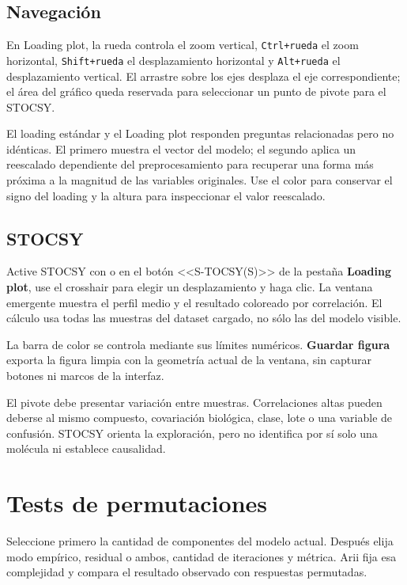 \documentclass[11pt,a4paper,openany]{report}
\newcommand{\menu}[1]{\textbf{#1}}
\newcommand{\code}[1]{\texttt{#1}}
\newcommand{\tecla}[1]{\fbox{\strut\textsf{#1}}}
\begin{document}
\section{Navegación}

En Loading plot, la rueda controla el zoom vertical, \code{Ctrl+rueda} el zoom
horizontal, \code{Shift+rueda} el desplazamiento horizontal y
\code{Alt+rueda} el desplazamiento vertical. El arrastre sobre los ejes desplaza
el eje correspondiente; el área del gráfico queda reservada para seleccionar un
punto de pivote para el STOCSY.

El loading estándar y el Loading plot responden preguntas relacionadas pero no
idénticas. El primero muestra el vector del modelo; el segundo aplica un
reescalado dependiente del preprocesamiento para recuperar una forma más próxima
a la magnitud de las variables originales. Use el color para conservar el signo
del loading y la altura para inspeccionar el valor reescalado.

\section{STOCSY}

Active STOCSY con \tecla{S} o en el botón <<S-TOCSY(S)>> de la pestaña \menu{Loading plot}, use el crosshair para elegir un desplazamiento y haga clic. La ventana emergente muestra el perfil medio y el resultado coloreado por
correlación. El cálculo usa todas las muestras del dataset cargado, no sólo las
del modelo visible.

La barra de color se controla mediante sus límites numéricos. \menu{Guardar
figura} exporta la figura limpia con la geometría actual de la ventana, sin
capturar botones ni marcos de la interfaz.

El pivote debe presentar variación entre muestras. Correlaciones altas pueden
deberse al mismo compuesto, covariación biológica, clase, lote o una variable de
confusión. STOCSY orienta la exploración, pero no identifica por sí solo una
molécula ni establece causalidad.

\chapter{Tests de permutaciones}

Seleccione primero la cantidad de componentes del modelo actual. Después elija
modo empírico, residual o ambos, cantidad de iteraciones y métrica. Arii fija esa complejidad y compara el resultado observado con respuestas permutadas.
\end{document}
